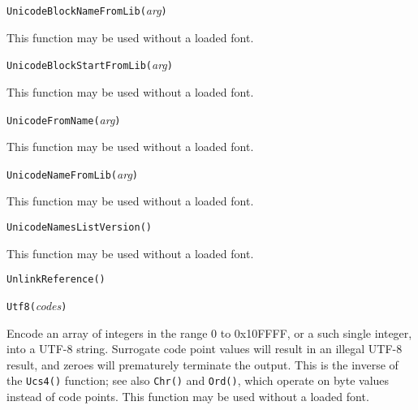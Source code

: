 
\texttt{UnicodeBlockNameFromLib(}\textit{arg}\texttt{)}

This function may be used without a loaded font.



\texttt{UnicodeBlockStartFromLib(}\textit{arg}\texttt{)}

This function may be used without a loaded font.



\texttt{UnicodeFromName(}\textit{arg}\texttt{)}

This function may be used without a loaded font.



\texttt{UnicodeNameFromLib(}\textit{arg}\texttt{)}

This function may be used without a loaded font.



\texttt{UnicodeNamesListVersion(}\texttt{)}

This function may be used without a loaded font.



\texttt{UnlinkReference(}\texttt{)}



\texttt{Utf8(}\textit{codes}\texttt{)}

Encode an array of integers in the range 0 to 0x10FFFF, or a such single
integer, into a UTF-8 string.  Surrogate code point values will result in
an illegal UTF-8 result, and zeroes will prematurely terminate the output. 
This is the inverse of the \texttt{Ucs4()} function; see also \texttt{Chr()}
and \texttt{Ord()}, which operate on byte values instead of code points. 
This function may be used without a loaded font.



